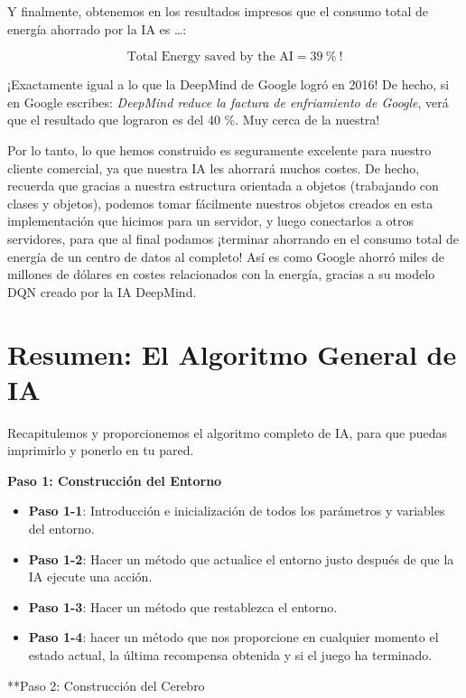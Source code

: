 \documentclass[
]{book}
\providecommand{\tightlist}{%
  \setlength{\itemsep}{0pt}\setlength{\parskip}{0pt}}
\begin{document}
Y finalmente, obtenemos en los resultados impresos que el consumo total de energía ahorrado por la IA es \ldots:

\[\textrm{Total Energy saved by the AI} = 39 \ \% \ !\]

¡Exactamente igual a lo que la DeepMind de Google logró en 2016! De hecho, si en Google escribes: \emph{DeepMind reduce la factura de enfriamiento de Google}, verá que el resultado que lograron es del 40 \%. Muy cerca de la nuestra!

Por lo tanto, lo que hemos construido es seguramente excelente para nuestro cliente comercial, ya que nuestra IA les ahorrará muchos costes. De hecho, recuerda que gracias a nuestra estructura orientada a objetos (trabajando con clases y objetos), podemos tomar fácilmente nuestros objetos creados en esta implementación que hicimos para un servidor, y luego conectarlos a otros servidores, para que al final podamos ¡terminar ahorrando en el consumo total de energía de un centro de datos al completo! Así es como Google ahorró miles de millones de dólares en costes relacionados con la energía, gracias a su modelo DQN creado por la IA DeepMind.

\hypertarget{resumen-el-algoritmo-general-de-ia}{%
\section{Resumen: El Algoritmo General de IA}\label{resumen-el-algoritmo-general-de-ia}}

Recapitulemos y proporcionemos el algoritmo completo de IA, para que puedas imprimirlo y ponerlo en tu pared.

\textbf{Paso 1: Construcción del Entorno}

\begin{itemize}
\tightlist
\item
  \textbf{Paso 1-1}: Introducción e inicialización de todos los parámetros y variables del entorno.
\item
  \textbf{Paso 1-2}: Hacer un método que actualice el entorno justo después de que la IA ejecute una acción.
\item
  \textbf{Paso 1-3}: Hacer un método que restablezca el entorno.
\item
  \textbf{Paso 1-4}: hacer un método que nos proporcione en cualquier momento el estado actual, la última recompensa obtenida y si el juego ha terminado.
\end{itemize}

**Paso 2: Construcción del Cerebro
\end{document}

